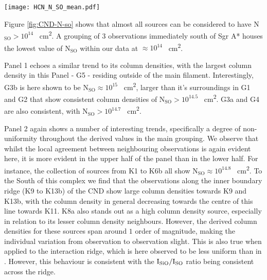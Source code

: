 \documentclass[twocolumn]{aastex631}
\begin{document}
\begin{figure*}
    \centering
    \texttt{[image: HCN\_N\_SO\_mean.pdf]}
    \caption{As per Figure \ref{fig:CND-N-sio}, but here the colour of the circular regions represents  column density N$_{\mathrm{SO}}$ towards each observation outlined in Section \ref{sec:obs}.}
    \label{fig:CND-N-so}
\end{figure*}

Figure \ref{fig:CND-N-so} shows that almost all sources can be considered to have N$_{\mathrm{SO}} > 10^{14}$ \si{\per\centi\meter\squared}. A grouping of $3$ observations immediately south of Sgr A* houses the lowest value of N$_{\mathrm{SO}}$ within our data at $\approx 10^{14}$ \si{\per\centi\meter\squared}.

Panel 1 echoes a similar trend to its  column densities, with the largest column density in this Panel - G5 - residing outside of the main  filament. Interestingly, G3b is here shown to be N$_{\mathrm{SO}} \approx 10^{15}$ \si{\per\centi\meter\squared}, larger than it's surroundings in G1 and G2 that show consistent column densities of N$_{\mathrm{SO}} > 10^{14.5}$ \si{\per\centi\meter\squared}. G3a and G4 are also consistent, with N$_{\mathrm{SO}} > 10^{14.7}$ \si{\per\centi\meter\squared}.

Panel 2 again shows a number of interesting trends, specifically a degree of non-uniformity throughout the derived values in the main grouping. We observe that whilst the local agreement between neighbouring observations is again evident here, it is more evident in the upper half of the panel than in the lower half. For instance, the collection of sources from K1 to K6b all show N$_{\mathrm{SO}} \approx 10^{14.8}$ \si{\per\centi\meter\squared}. To the South of this complex we find that the observations along the inner boundary ridge (K9 to K13b) of the CND show large column densities towards K9 and K13b, with the column density in general decreasing towards the centre of this line towards K11. K8a also stands out as a high column density source, especially in relation to its lesser column density neighbours. However, the derived column densities for these sources span around $1$ order of magnitude, making the individual variation from observation to observation slight. This is also true when applied to the interaction ridge, which is here observed to be less uniform than in . However, this behaviour is consistent with the $\mathrm{I_{\ce{SiO}}/I_{\ce{SO}}}$ ratio being consistent across the ridge.
\end{document}
